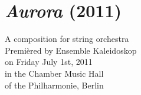 \chapter{\emph{Aurora} (2011)}
\label{chap:aurora}

\begin{singlespacing}
\begin{flushright}
A composition for string orchestra \\
\vspace*{\baselineskip}
Premi\`{e}red by Ensemble Kaleidoskop \\
on Friday July 1st, 2011 \\
in the Chamber Music Hall \\
of the Philharmonie, Berlin
\end{flushright}
\end{singlespacing}

